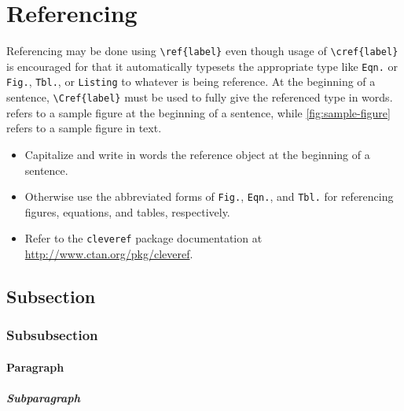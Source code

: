 \section{Referencing}\label{sec:referencing}

Referencing may be done using \lstinline!\ref{label}! even though usage of \lstinline!\cref{label}! is encouraged for that it automatically typesets the appropriate type like \texttt{Eqn.} or \texttt{Fig.}, \texttt{Tbl.}, or \texttt{Listing} to whatever is being reference. At the beginning of a sentence, \lstinline!\Cref{label}! must be used to fully give the referenced type in words.  refers to a sample figure at the beginning of a sentence, while \cref{fig:sample-figure} refers to a sample figure in text.

\begin{itemize}
    \item Capitalize and write in words the reference object at the beginning of a sentence.
    \item Otherwise use the abbreviated forms of \texttt{Fig.}, \texttt{Eqn.}, and \texttt{Tbl.} for referencing figures, equations, and tables, respectively.
    \item Refer to the \lstinline!cleveref! package documentation at \\\url{http://www.ctan.org/pkg/cleveref}.
\end{itemize}

\subsection{Subsection}

\subsubsection{Subsubsection}

\paragraph{Paragraph}

\subparagraph{Subparagraph}